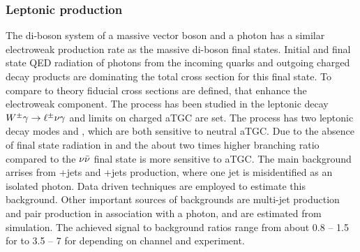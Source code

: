 \subsubsection{Leptonic \Vg production}
\label{sss-Vgammaprod}



The di-boson system of a massive vector boson and a photon has a similar 
electroweak production rate as the massive di-boson final states. Initial
and final state QED radiation of photons from the incoming quarks and
outgoing charged decay products are dominating the total cross section 
for this final state. To compare to theory fiducial cross sections are defined,
that enhance the electroweak component. The \Wg process has been studied in the
leptonic decay $W^{\pm}\gamma \rightarrow \ell^\pm \nu \gamma $ and limits on charged aTGC are set. The \Zg process
has two leptonic decay modes \Zgllg\; and \Zgvvg, which are both sensitive
to neutral aTGC. Due to the absence of final state radiation in \Ztovv\;
and the about two times higher branching ratio compared to \Ztoll\;
the $\nu\bar{\nu}$ final state is more sensitive to aTGC.
The main background arrises from \W+jets and \Z+jets production, where one 
jet is misidentified as an isolated photon. Data driven techniques are employed
to estimate this background. Other important sources of backgrounds are multi-jet production
and \ttbar\; pair production in association with a photon, and are estimated from simulation.
The achieved signal to background ratios range from about 0.8 -- 1.5 for \Wglvg\; to 3.5 -- 7 for \Ztoll\;
depending on channel and experiment. 

